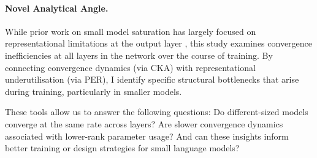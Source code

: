 \paragraph{Novel Analytical Angle.}
While prior work on small model saturation has largely focused on representational limitations at the output layer \citep{godey2024small, yang2018breaking}, this study examines convergence inefficiencies at all layers in the network over the course of training. By connecting convergence dynamics (via CKA) with representational underutilisation (via PER), I identify specific structural bottlenecks that arise during training, particularly in smaller models.

These tools allow us to answer the following questions: Do different-sized models converge at the same rate across layers? Are slower convergence dynamics associated with lower-rank parameter usage? And can these insights inform better training or design strategies for small language models?







